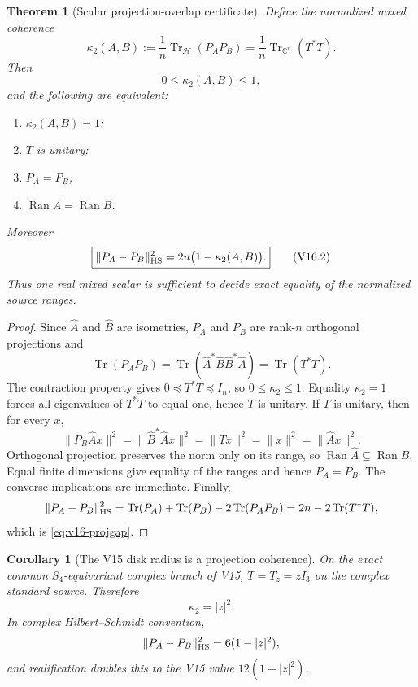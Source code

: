 \documentclass[11pt]{article}
\newtheorem{theorem}{Theorem}[section]
\newtheorem{corollary}[corollary]{Corollary}
\theoremstyle{definition}
\theoremstyle{remark}
\newcommand{\Tr}{\operatorname{Tr}}
\begin{document}
\begin{theorem}[Scalar projection-overlap certificate]
\label{thm:v16-projection-overlap}
Define the normalized mixed coherence
\[
 \boxed{
 \kappa_2(A,B)
 :=\frac1n\Tr_{\mathcal H}(P_AP_B)
 =\frac1n\Tr_{\mathbb C^n}(T^*T).}
 \tag{V16.1}\label{eq:v16-kappa}
\]
Then
\[
 0\le \kappa_2(A,B)\le1,
\]
and the following are equivalent:
\begin{enumerate}[label=\textup{(\roman*)},leftmargin=2.8em]
\item $\kappa_2(A,B)=1$;
\item $T$ is unitary;
\item $P_A=P_B$;
\item $\operatorname{Ran}A=\operatorname{Ran}B$.
\end{enumerate}
Moreover
\[
 \boxed{
 \|P_A-P_B\|_{\rm HS}^2
 =2n\bigl(1-\kappa_2(A,B)\bigr).}
 \tag{V16.2}\label{eq:v16-projgap}
\]
Thus one real mixed scalar is sufficient to decide exact equality of the
normalized source ranges.
\end{theorem}

\begin{proof}
Since $\widehat A$ and $\widehat B$ are isometries,
$P_A$ and $P_B$ are rank-$n$ orthogonal projections and
\[
 \Tr(P_AP_B)
 =\Tr(\widehat A^*\widehat B\widehat B^*\widehat A)
 =\Tr(T^*T).
\]
The contraction property gives $0\preceq T^*T\preceq I_n$, so
$0\le\kappa_2\le1$.  Equality $\kappa_2=1$ forces all eigenvalues of
$T^*T$ to equal one, hence $T$ is unitary.  If $T$ is unitary, then for every
$x$,
\[
 \|P_B\widehat A x\|^2
 =\|\widehat B^*\widehat A x\|^2
 =\|Tx\|^2
 =\|x\|^2
 =\|\widehat A x\|^2.
\]
Orthogonal projection preserves the norm only on its range, so
$\operatorname{Ran}\widehat A\subseteq\operatorname{Ran}\widehat B$.  Equal finite dimensions give equality
of the ranges and hence $P_A=P_B$.  The converse implications are immediate.
Finally,
\[
 \|P_A-P_B\|_{\rm HS}^2
 =\Tr(P_A)+\Tr(P_B)-2\Tr(P_AP_B)
 =2n-2\Tr(T^*T),
\]
which is \eqref{eq:v16-projgap}.
\end{proof}

\begin{corollary}[The V15 disk radius is a projection coherence]
\label{cor:v16-disk-kappa}
On the exact common $S_4$-equivariant complex branch of V15,
$T=T_z=zI_3$ on the complex standard source.  Therefore
\[
 \boxed{\kappa_2=|z|^2.}
 \tag{V16.3}
\]
In complex Hilbert--Schmidt convention,
\[
 \|P_A-P_B\|_{\rm HS}^2=6(1-|z|^2),
\]
and realification doubles this to the V15 value
$12(1-|z|^2)$.
\end{corollary}
\end{document}
